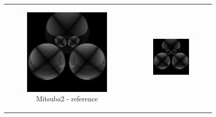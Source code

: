 \begin{figure}[h]
	\centering
	\begin{tabular}{cc}
		\begin{subfigure}
			{0.4\textwidth}\centering\includegraphics[width=\linewidth]{img/polarizing_spheres.s1.png}
			\caption{Mitsuba2 - reference}
		\end{subfigure}
		&
		\begin{subfigure}
			{0.4\textwidth}\centering\includegraphics[width=\linewidth]{img/polarizing_spheres.s1_ART.png}

\end{subfigure}
\end{tabular}
\end{figure}
